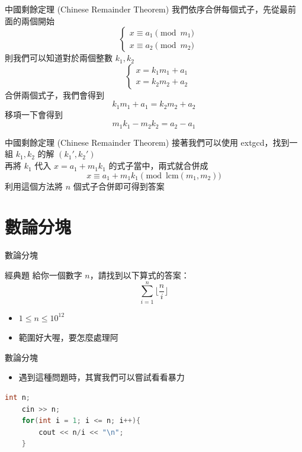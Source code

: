 \documentclass[aspectratio=169]{beamer}
\begin{document}
    \begin{frame}{中國剩餘定理 (Chinese Remainder Theorem)}
        我們依序合併每個式子，先從最前面的兩個開始
        $$\quad \left\{ \begin{matrix} x \equiv a_1 \pmod {m_1} \\ x \equiv a_2 \pmod {m_2} \end{matrix} \right.$$
        則我們可以知道對於兩個整數 $k_1, k_2$
        $$\quad \left\{ \begin{matrix} x = k_1m_1 + a_1 \\ x = k_2m_2 + a_2 \end{matrix} \right.$$
        合併兩個式子，我們會得到
        $$k_1m_1 + a_1 = k_2m_2 + a_2$$
        移項一下會得到
        $$m_1k_1 - m_2k_2 = a_2-a_1$$
    \end{frame}
    
    \begin{frame}{中國剩餘定理 (Chinese Remainder Theorem)}
        接著我們可以使用 extgcd，找到一組 $k_1, k_2$ 的解 $(k_1', k_2')$ \\
        \vspace{5mm}
        再將 $k_1$ 代入 $x = a_1 + m_1k_1$ 的式子當中，兩式就合併成 
        $$x \equiv a_1 + m_1 k_1 \pmod {\text{lcm}(m_1,m_2)}$$
        利用這個方法將 $n$ 個式子合併即可得到答案
    \end{frame}
    
    \section{數論分塊}
    
    \begin{frame}{數論分塊}
        \begin{block}{經典題}
            給你一個數字 $n$，請找到以下算式的答案：
            $$\sum_{i=1}^n \lfloor \frac{n}{i} \rfloor$$ 
            \begin{itemize}
                \item $1 \le n \le 10^{12}$
            \end{itemize}
        \end{block}
        \begin{itemize}
            \item<2-> 範圍好大喔，要怎麼處理阿
        \end{itemize}
    \end{frame}
    
    \begin{frame}[fragile]{數論分塊}
        \begin{itemize}
            \item 遇到這種問題時，其實我們可以嘗試看看暴力
        \end{itemize}
        \begin{lstlisting}[language=C++,basicstyle=\ttfamily\small]
    int n;
    cin >> n;
    for(int i = 1; i <= n; i++){
        cout << n/i << "\n";
    }
        \end{lstlisting}
    \end{frame}
    
\end{document}
